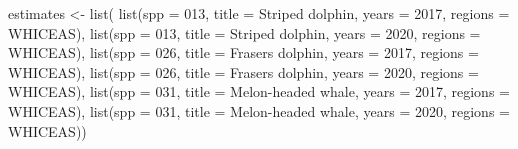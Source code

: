 \documentclass[
]{book}
\newenvironment{Shaded}{\begin{snugshade}}{\end{snugshade}}
\newcommand{\AttributeTok}[1]{\textcolor[rgb]{0.77,0.63,0.00}{#1}}
\newcommand{\DecValTok}[1]{\textcolor[rgb]{0.00,0.00,0.81}{#1}}
\newcommand{\FunctionTok}[1]{\textcolor[rgb]{0.00,0.00,0.00}{#1}}
\newcommand{\NormalTok}[1]{#1}
\newcommand{\OtherTok}[1]{\textcolor[rgb]{0.56,0.35,0.01}{#1}}
\newcommand{\StringTok}[1]{\textcolor[rgb]{0.31,0.60,0.02}{#1}}
\begin{document}
\begin{Shaded}
\begin{Highlighting}[]
\NormalTok{estimates }\OtherTok{\textless{}{-}} \FunctionTok{list}\NormalTok{(}
    \FunctionTok{list}\NormalTok{(}\AttributeTok{spp =} \StringTok{\textquotesingle{}013\textquotesingle{}}\NormalTok{,}
         \AttributeTok{title =} \StringTok{\textquotesingle{}Striped dolphin\textquotesingle{}}\NormalTok{,}
         \AttributeTok{years =} \DecValTok{2017}\NormalTok{,}
         \AttributeTok{regions =} \StringTok{\textquotesingle{}WHICEAS\textquotesingle{}}\NormalTok{),}
    \FunctionTok{list}\NormalTok{(}\AttributeTok{spp =} \StringTok{\textquotesingle{}013\textquotesingle{}}\NormalTok{,}
         \AttributeTok{title =} \StringTok{\textquotesingle{}Striped dolphin\textquotesingle{}}\NormalTok{,}
         \AttributeTok{years =} \DecValTok{2020}\NormalTok{,}
         \AttributeTok{regions =} \StringTok{\textquotesingle{}WHICEAS\textquotesingle{}}\NormalTok{),}
    \FunctionTok{list}\NormalTok{(}\AttributeTok{spp =} \StringTok{\textquotesingle{}026\textquotesingle{}}\NormalTok{,}
         \AttributeTok{title =} \StringTok{\textquotesingle{}Frasers dolphin\textquotesingle{}}\NormalTok{,}
         \AttributeTok{years =} \DecValTok{2017}\NormalTok{,}
         \AttributeTok{regions =} \StringTok{\textquotesingle{}WHICEAS\textquotesingle{}}\NormalTok{),}
    \FunctionTok{list}\NormalTok{(}\AttributeTok{spp =} \StringTok{\textquotesingle{}026\textquotesingle{}}\NormalTok{,}
         \AttributeTok{title =} \StringTok{\textquotesingle{}Frasers dolphin\textquotesingle{}}\NormalTok{,}
         \AttributeTok{years =} \DecValTok{2020}\NormalTok{,}
         \AttributeTok{regions =} \StringTok{\textquotesingle{}WHICEAS\textquotesingle{}}\NormalTok{),}
    \FunctionTok{list}\NormalTok{(}\AttributeTok{spp =} \StringTok{\textquotesingle{}031\textquotesingle{}}\NormalTok{,}
         \AttributeTok{title =} \StringTok{\textquotesingle{}Melon{-}headed whale\textquotesingle{}}\NormalTok{,}
         \AttributeTok{years =} \DecValTok{2017}\NormalTok{,}
         \AttributeTok{regions =} \StringTok{\textquotesingle{}WHICEAS\textquotesingle{}}\NormalTok{),}
    \FunctionTok{list}\NormalTok{(}\AttributeTok{spp =} \StringTok{\textquotesingle{}031\textquotesingle{}}\NormalTok{,}
         \AttributeTok{title =} \StringTok{\textquotesingle{}Melon{-}headed whale\textquotesingle{}}\NormalTok{,}
         \AttributeTok{years =} \DecValTok{2020}\NormalTok{,}
         \AttributeTok{regions =} \StringTok{\textquotesingle{}WHICEAS\textquotesingle{}}\NormalTok{))}
\end{Highlighting}
\end{Shaded}
\end{document}
